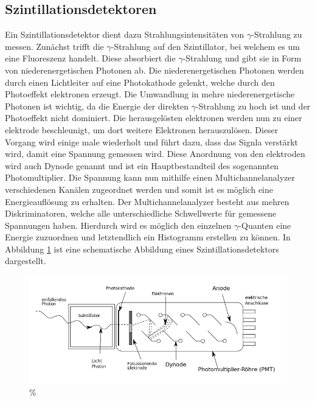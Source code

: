 \subsection{Szintillationsdetektoren}
Ein Szintillationsdetektor dient dazu Strahlungsintensitäten von $ \gamma$-Strahlung zu messen. Zunächst trifft die $\gamma$-Strahlung auf den Szintillator, bei welchem es um eine Fluoreszenz handelt. Diese absorbiert die $\gamma$-Strahlung und gibt sie in Form von niederenergetischen Photonen ab. 
Die niederenergetischen Photonen werden durch einen Lichtleiter auf eine Photokathode gelenkt, welche durch den Photoeffekt elektronen erzeugt. Die Umwandlung in mehre niederenergetische Photonen ist wichtig, da die Energie der direkten $\gamma$-Strahlung zu hoch ist und der Photoeffekt nicht dominiert.
Die herausgelösten elektronen werden nun zu einer elektrode beschleunigt, um dort weitere Elektronen herauszulösen. Dieser Vorgang wird einige male wiederholt und führt dazu, dass das Signla verstärkt wird, damit eine Spannung gemessen wird.
Diese Anordnung von den elektroden wird auch Dynode genannt und ist ein Hauptbestandteil des sogenannten Photomultiplier. 
Die Spannung kann nun mithilfe einen Multichannelanalyzer verschiedenen Kanälen zugeordnet werden und somit ist es möglich eine Energieauflösung zu erhalten. 
Der Multichannelanalyzer besteht aus mehren Diskriminatoren, welche alle unterschiedliche Schwellwerte für gemessene Spannungen haben. Hierdurch wird es möglich den einzelnen $\gamma$-Quanten eine Energie zuzuordnen und letztendlich ein Histogramm erstellen zu können.
In Abbildung \ref{fig:detektor} ist eine schematische Abbildung eines Szintillationsdetektors dargestellt.
\begin{figure}
    \centering
    \includegraphics[width = \linewidth]{content/detektor.png}
    \caption{\%\cite{detektor}}
    \label{fig:detektor}
\end{figure}
